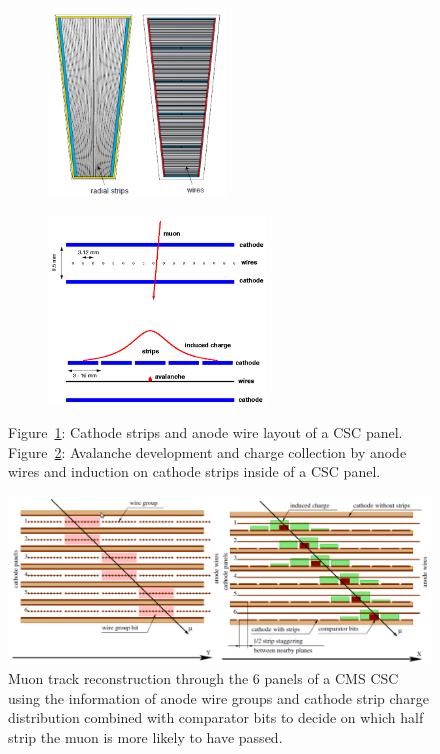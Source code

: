 	\begin{figure}[H]
		\begin{subfigure}{0.4\linewidth}
			\centering
			\includegraphics[height = 5cm]{fig/chapt3/CSC_layout.png}
			\caption{\label{fig:CSC-layout:A}}
		\end{subfigure}
		\begin{subfigure}{0.6\linewidth}
			\centering
			\includegraphics[height = 5cm]{fig/chapt3/CSC_avalanche.png}
			\caption{\label{fig:CSC-layout:B}}
		\end{subfigure}
		\caption{\label{fig:CSC-layout} Figure~\ref{fig:CSC-layout:A}: Cathode strips and anode wire layout of a CSC panel. Figure~\ref{fig:CSC-layout:B}: Avalanche development and charge collection by anode wires and induction on cathode strips inside of a CSC panel.}
	\end{figure}
	
	\begin{figure}[H]
		\centering
		\includegraphics[width=\linewidth]{fig/chapt3/CSC_track.png}
		\caption{\label{fig:CSC-track} Muon track reconstruction through the 6 panels of a CMS CSC using the information of anode wire groups and cathode strip charge distribution combined with comparator bits to decide on which half strip the muon is more likely to have passed.}
	\end{figure}
	

